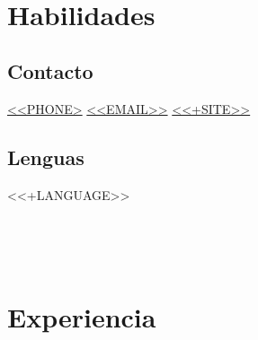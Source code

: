 \documentclass{structure}
\begin{document}


\hfill\\[0.5cm]


\section{Habilidades} %
\begin{minipage}{0.7\textwidth}
\end{minipage}%
\hfill{\color{RoyalPurple}\vline}\hfill%
\begin{minipage}{0.25\textwidth}
    \begin{flushleft}
        \subsection{Contacto} %
        \href{tel:<<PHONE>>}{<<PHONE>}\linebreak
        \href{mailto:<<EMAIL>>}{<<EMAIL>>}\linebreak
        \href{<<+FULLSITE>>}{<<+SITE>>}\linebreak
        \subsection{Lenguas}  %
        <<+LANGUAGE>>\linebreak
    \end{flushleft}
    \,\vfill
\end{minipage}%

\hfill\\[0.5cm]


\section{Experiencia}
\end{document}
